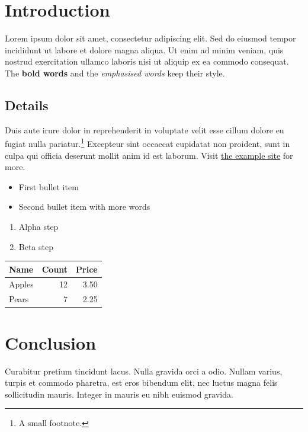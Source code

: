 \documentclass[11pt]{article}
\begin{document}
\section{Introduction}
Lorem ipsum dolor sit amet, consectetur adipiscing elit. Sed do eiusmod tempor
incididunt ut labore et dolore magna aliqua. Ut enim ad minim veniam, quis
nostrud exercitation ullamco laboris nisi ut aliquip ex ea commodo consequat.
The \textbf{bold words} and the \emph{emphasised words} keep their style.

\subsection{Details}
Duis aute irure dolor in reprehenderit in voluptate velit esse cillum dolore eu
fugiat nulla pariatur.\footnote{A small footnote.} Excepteur sint occaecat
cupidatat non proident, sunt in culpa qui officia deserunt mollit anim id est
laborum. Visit \href{https://example.com/docs}{the example site} for more.

\begin{itemize}
\item First bullet item
\item Second bullet item with more words
\end{itemize}

\begin{enumerate}
\item Alpha step
\item Beta step
\end{enumerate}

\begin{tabular}{|l|r|r|}
\hline
Name & Count & Price \\
\hline
Apples & 12 & 3.50 \\
Pears & 7 & 2.25 \\
\hline
\end{tabular}

\section{Conclusion}
Curabitur pretium tincidunt lacus. Nulla gravida orci a odio. Nullam varius,
turpis et commodo pharetra, est eros bibendum elit, nec luctus magna felis
sollicitudin mauris. Integer in mauris eu nibh euismod gravida.
\end{document}
